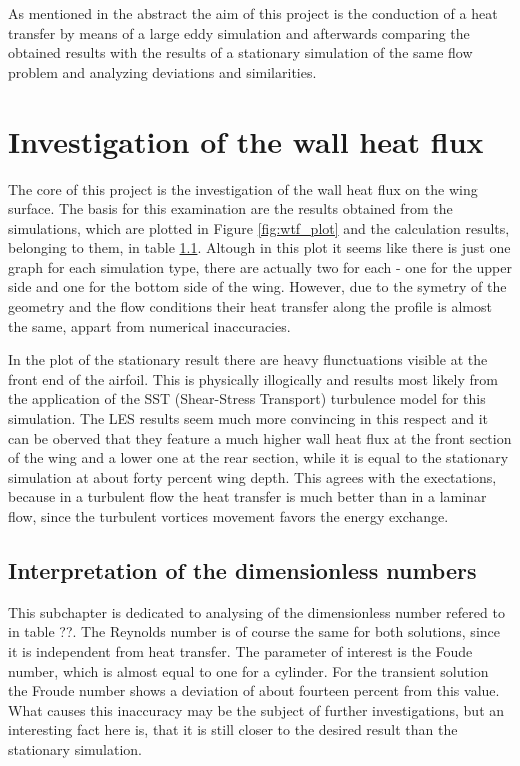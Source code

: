 As mentioned in the abstract the aim of this project is the conduction of a heat transfer by means of a large eddy simulation and afterwards comparing the obtained results with the results of a stationary simulation of the same flow problem and analyzing deviations and similarities.
\section{Investigation of the wall heat flux}
The core of this project is the investigation of the wall heat flux on the wing surface. The basis for this examination are the results obtained from the simulations, which are plotted in Figure \ref{fig:wtf_plot} and the calculation results, belonging to them, in table \ref{}. Altough in this plot it seems like there is just one graph for each simulation type, there are actually two for each - one for the upper side and one for the bottom side of the wing. However, due to the symetry of the geometry and the flow conditions their heat transfer along the profile is almost the same, appart from numerical inaccuracies.
	
In the plot of the stationary result there are heavy flunctuations visible at the front end of the airfoil. This is physically illogically and results most likely from the application of the SST (Shear-Stress Transport) turbulence model for this simulation. The LES results seem much more convincing in this respect and it can be oberved that they feature a much higher wall heat flux at the front section of the wing and a lower one at the rear section, while it is equal to the stationary simulation at about forty percent wing depth. This agrees with the exectations, because in a turbulent flow the heat transfer is much better than in a laminar flow, since the turbulent vortices movement favors the energy exchange.
\subsection{Interpretation of the dimensionless numbers}
This subchapter is dedicated to analysing of the dimensionless number refered to in table ??. The Reynolds number is of course the same for both solutions, since it is independent from heat transfer.
The parameter of interest is the Foude number, which is almost equal to one for a cylinder. For the transient solution the Froude number shows a deviation of about fourteen percent from this value. What causes this inaccuracy may be the subject of further investigations, but an interesting fact here is, that it is still closer to the desired result than the stationary simulation.
